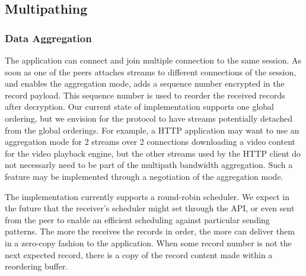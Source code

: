 


\subsection{Multipathing}

\subsubsection{Data Aggregation}
The application can connect and join multiple \tcp connection to
the same \tcpls session. As soon as one of the peers attaches streams to
different \tcp connections of the session, and enables the aggregation mode,
\tcpls adds a sequence number encrypted in the \tls record payload. This
sequence number is used to reorder the received records after decryption. Our
current state of implementation supports one global ordering, but
we envision for the \tcpls protocol to have streams potentially detached from
the global orderings. For example, a HTTP application may want to use an
aggregation mode for 2 streams over 2 \tcp connections downloading a video
content for the video playback engine, but the other streams used by the HTTP
client do not necessarly need to be part of the multipath bandwidth aggregation.
Such a feature may be implemented through a negotiation of the aggregation
mode.

The implementation currently supports a round-robin scheduler. We expect in the
future that the receiver's scheduler might set through the API, or even sent
from the peer to enable an efficient scheduling against particular sending patterns. The more
the \tcpls receives the records in order, the more \tcpls can deliver them in a zero-copy
fashion to the application. When some record number is not the next expected
record, there is a copy of the record content made within a reordering buffer.

